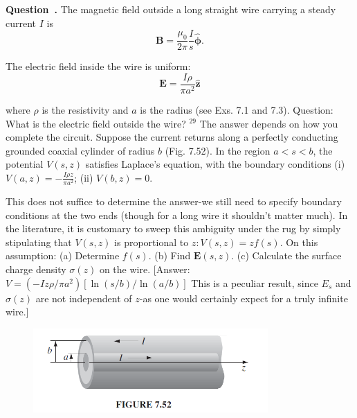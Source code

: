 \documentclass[12pt, a4paper, oneside]{report}
\newcounter{question}
\newenvironment{question}[1][]{\refstepcounter{question}\par\medskip
   \begin{mdframed}[backgroundcolor=gray!20]
   \noindent \textbf{Question~\thequestion. #1} \rmfamily}{\end{mdframed}\medskip}
\begin{document}
\begin{question}
The magnetic field outside a long straight wire carrying a steady current $I$ is
$$
\mathbf{B}=\frac{\mu_0}{2 \pi} \frac{I}{s} \hat{\boldsymbol{\phi}} .
$$

The electric field inside the wire is uniform:
$$
\mathbf{E}=\frac{I \rho}{\pi a^2} \hat{\mathbf{z}}
$$

where $\rho$ is the resistivity and $a$ is the radius (see Exs. 7.1 and 7.3). Question: What is the electric field outside the wire? ${ }^{29}$ The answer depends on how you complete the circuit. Suppose the current returns along a perfectly conducting grounded coaxial cylinder of radius $b$ (Fig. 7.52). In the region $a<s<b$, the potential $V(s, z)$ satisfies Laplace's equation, with the boundary conditions
(i) $V(a, z)=-\frac{I \rho z}{\pi a^2}$;
(ii) $V(b, z)=0$.

This does not suffice to determine the answer-we still need to specify boundary conditions at the two ends (though for a long wire it shouldn't matter much). In the literature, it is customary to sweep this ambiguity under the rug by simply stipulating that $V(s, z)$ is proportional to $z: V(s, z)=z f(s)$. On this assumption:
(a) Determine $f(s)$.
(b) Find $\mathbf{E}(s, z)$.
(c) Calculate the surface charge density $\sigma(z)$ on the wire.
[Answer: $V=\left(-I z \rho / \pi a^2\right)[\ln (s / b) / \ln (a / b)]$ This is a peculiar result, since $E_s$ and $\sigma(z)$ are not independent of $z$-as one would certainly expect for a truly infinite wire.]
\end{question}

\begin{figure}[ht!]
    \centering
    \includegraphics[width=0.8\textwidth]{17.png}
    \caption{}
    \label{fig:enter-label}
\end{figure}
\end{document}
